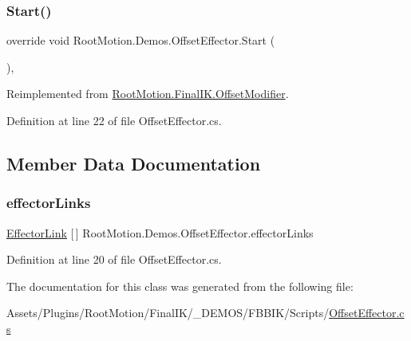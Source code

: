 \subsubsection{\texorpdfstring{Start()}{Start()}}
{\footnotesize\ttfamily override void Root\+Motion.\+Demos.\+Offset\+Effector.\+Start (\begin{DoxyParamCaption}{ }\end{DoxyParamCaption})\hspace{0.3cm}{\ttfamily [protected]}, {\ttfamily [virtual]}}



Reimplemented from \mbox{\hyperlink{class_root_motion_1_1_final_i_k_1_1_offset_modifier_a10d007a731b89218a14935a09552cb77}{Root\+Motion.\+Final\+I\+K.\+Offset\+Modifier}}.



Definition at line 22 of file Offset\+Effector.\+cs.



\subsection{Member Data Documentation}
\mbox{\label{class_root_motion_1_1_demos_1_1_offset_effector_a50490b95d04d2e076f58e9de4485a634}} 
\subsubsection{\texorpdfstring{effector\+Links}{effectorLinks}}
{\footnotesize\ttfamily \mbox{\hyperlink{class_root_motion_1_1_demos_1_1_offset_effector_1_1_effector_link}{Effector\+Link}} \mbox{[}$\,$\mbox{]} Root\+Motion.\+Demos.\+Offset\+Effector.\+effector\+Links}



Definition at line 20 of file Offset\+Effector.\+cs.



The documentation for this class was generated from the following file\+:\begin{DoxyCompactItemize}
\item 
Assets/\+Plugins/\+Root\+Motion/\+Final\+I\+K/\+\_\+\+D\+E\+M\+O\+S/\+F\+B\+B\+I\+K/\+Scripts/\mbox{\hyperlink{_offset_effector_8cs}{Offset\+Effector.\+cs}}\end{DoxyCompactItemize}
